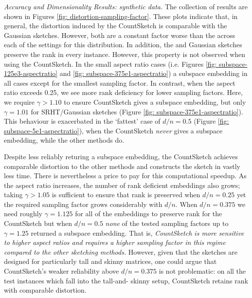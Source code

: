 \noindent
\textit{Accuracy and Dimensionality Results: synthetic data.}
The collection of results are shown in Figures \ref{fig: distortion-sampling-factor}.
These plots indicate that, in general, the distortion induced by the CountSketch is
comparable with the Gaussian sketches.
However, both are a constant factor worse
than the \SRHT across each of the settings for this distribution.
In addition, the \SRHT and Gaussian sketches preserve the rank in
every instance.
However, this property is not observed when using the CountSketch.
In the small aspect ratio cases (i.e. Figures \ref{fig: subspace-125e3-aspectratio}
and \ref{fig: subspace-375e1-aspectratio}) a subspace embedding in all cases
except for the smallest sampling factor.
In contrast, when the aspect ratio exceeds 0.25, we see more rank deficiency for
lower sampling factors.
Here, we require $\gamma > 1.10$ to ensure CountSketch gives a
subspace embedding, but only $\gamma = 1.01$ for SRHT/Gaussian
sketches (Figure \ref{fig: subspace-375e1-aspectratio}).
This behaviour is exacerbated in the `fattest' case of $d/n = 0.5$
(Figure \ref{fig: subspace-5e1-aspectratio}),
when the CountSketch \textit{never} gives a subspace
embedding, while the other methods do.

Despite less reliably returing a subspace embedding,
the CountSketch achieves comparable distortion to the other methods and constructs
the sketch in vastly less time.
There is nevertheless a price to pay for this
computational speedup.
As the aspect ratio increases, the number of rank deficient embeddings also
grows; taking $\gamma > 1.05$ is sufficient to ensure that rank is preserved
when $d/n=0.25$ yet the required sampling factor grows considerably with $d/n$.
When $d/n=0.375$ we need roughly $\gamma = 1.125$ for all of the embeddings to
preserve rank for the CountSketch but when $d/n = 0.5$ \textit{none} of the
tested sampling factors up to $\gamma=1.25$ returned a subspace embedding.
That is, \textit{CountSketch is more sensitive to higher aspect ratios and
requires a higher sampling factor in this regime compared to the other
sketching methods.}
However, given that the sketches are designed for particularly tall and skinny
matrices, one could argue that CountSketch's weaker reliability above
$d/n = 0.375$
is  not problematic: on all the test instances which fall into the tall-and-
skinny setup, CountSketch retains rank with comparable distortion.

